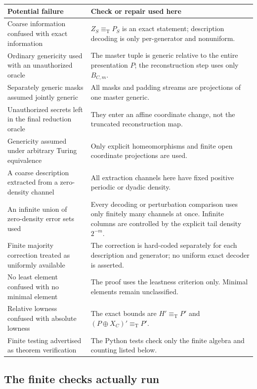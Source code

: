 \documentclass[11pt,letterpaper]{article}
\theoremstyle{plain}
\theoremstyle{definition}
\theoremstyle{remark}
\numberwithin{equation}{section}
\newcommand{\eqT}{\equiv_{\mathrm T}}
\newcommand{\join}{\mathbin{\oplus}}
\begin{document}
\begin{center}\small
\begin{longtable}{@{}p{}p{}@{}}
\toprule
Potential failure & Check or repair used here\\
\midrule
\endhead
Coarse information confused with exact information & $Z_S\eqT P_S$ is an exact statement; description decoding is only per-generator and nonuniform.\\
Ordinary genericity used with an unauthorized oracle & The master tuple is generic relative to the entire presentation $P$; the reconstruction step uses only $B_{C,m}$.\\
Separately generic masks assumed jointly generic & All masks and padding streams are projections of one master generic.\\
Unauthorized secrets left in the final reduction oracle & They enter an affine coordinate change, not the truncated reconstruction map.\\
Genericity assumed under arbitrary Turing equivalence & Only explicit homeomorphisms and finite open coordinate projections are used.\\
A coarse description extracted from a zero-density channel & All extraction channels here have fixed positive periodic or dyadic density.\\
An infinite union of zero-density error sets used & Every decoding or perturbation comparison uses only finitely many channels at once. Infinite columns are controlled by the explicit tail density $2^{-m}$.\\
Finite majority correction treated as uniformly available & The correction is hard-coded separately for each description and generator; no uniform exact decoder is asserted.\\
No least element confused with no minimal element & The proof uses the leastness criterion only. Minimal elements remain unclassified.\\
Relative lowness confused with absolute lowness & The exact bounds are $H'\eqT P'$ and $(P\join X_C)'\eqT P'$.\\
Finite testing advertised as theorem verification & The Python tests check only the finite algebra and counting listed below.\\
\bottomrule
\end{longtable}
\end{center}

\subsection{The finite checks actually run}\label{cr11:sec:checks}
\end{document}
